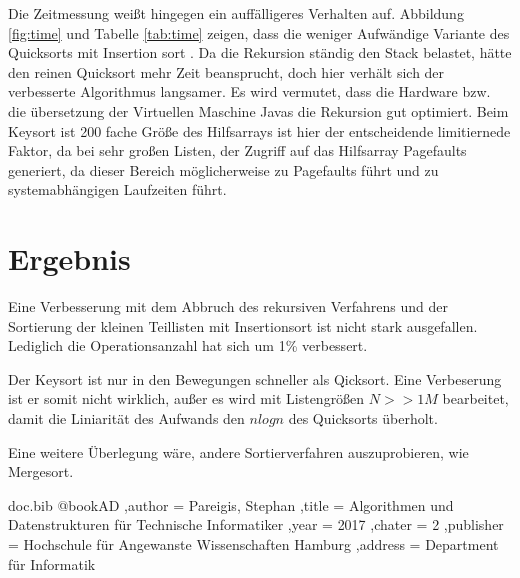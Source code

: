 \documentclass[
   draft=false
  ,paper=a4
  ,twoside=false
  ,fontsize=11pt
  ,headsepline
  ,DIV=11
  ,parskip=full+
  ,titlepage
]{scrartcl} %
\begin{document}
Die Zeitmessung weißt hingegen ein auffälligeres Verhalten auf. Abbildung \ref{fig:time} und Tabelle \ref{tab:time} zeigen, dass die weniger Aufwändige Variante des Quicksorts mit Insertion sort . Da die Rekursion ständig den Stack belastet, hätte den 
reinen Quicksort mehr Zeit beansprucht, doch hier verhält sich der verbesserte
Algorithmus langsamer. Es wird vermutet, dass die Hardware bzw. die übersetzung der Virtuellen Maschine Javas die Rekursion gut optimiert.
Beim Keysort ist 200 fache Größe des Hilfsarrays ist hier der entscheidende
 limitiernede Faktor, da bei sehr großen Listen, der Zugriff auf das 
 Hilfsarray Pagefaults generiert, da dieser Bereich möglicherweise zu
 Pagefaults führt und zu systemabhängigen Laufzeiten führt.

\section{Ergebnis}

Eine Verbesserung mit dem Abbruch des rekursiven Verfahrens und der Sortierung der kleinen Teillisten mit Insertionsort ist nicht stark ausgefallen. Lediglich die Operationsanzahl hat sich um 1\% verbessert. 

Der Keysort ist nur in den Bewegungen schneller als Qicksort. Eine Verbeserung ist er somit nicht wirklich, außer es wird mit Listengrößen $N>>1M$
bearbeitet, damit die Liniarität des Aufwands den $n log n$ des Quicksorts überholt.

Eine weitere Überlegung wäre, andere Sortierverfahren auszuprobieren, wie Mergesort. 

\begin{filecontents}{doc.bib}
@book{AD
  ,author    = {Pareigis, Stephan}
  ,title     = {Algorithmen und Datenstrukturen für Technische Informatiker}
  ,year      = {2017}
  ,chater    = 2
  ,publisher = {Hochschule für Angewanste Wissenschaften Hamburg}
  ,address   = {Department für Informatik}
}
\end{filecontents}
	
	


\end{document}
